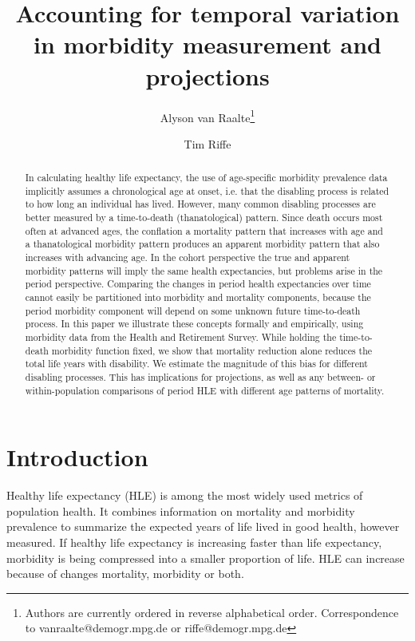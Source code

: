 \documentclass[11pt,oneside,a4paper]{article} %
\begin{document}
\title{Accounting for temporal variation in morbidity measurement
and projections}

\author[1]{Alyson van Raalte\thanks{Authors are currently ordered in reverse
alphabetical order. Correspondence to vanraalte@demogr.mpg.de or
riffe@demogr.mpg.de}}
\author[1]{Tim Riffe}


\maketitle

\begin{abstract}
In calculating healthy life expectancy, the use of age-specific morbidity
prevalence data implicitly assumes a chronological age at onset, i.e. that the
disabling process is related to how long an individual has lived. However, many
common disabling processes are better measured by a time-to-death
(thanatological) pattern.
Since death occurs most often at advanced ages, the conflation a mortality
pattern that increases with age and a thanatological morbidity pattern produces
an apparent morbidity pattern that also increases with advancing age. In the
cohort perspective the true and apparent morbidity patterns will imply the same
health expectancies, but problems arise in the period perspective. Comparing the
changes in period health expectancies over time cannot easily be partitioned
into morbidity and mortality components, because the period morbidity component
will depend on some unknown future time-to-death process. In this paper we
illustrate these concepts formally and empirically, using morbidity data from
the Health and Retirement Survey. While holding the time-to-death morbidity
function fixed, we show that mortality reduction alone reduces the total life
years with disability. We estimate the magnitude of this bias for different
disabling processes. This has implications for projections, as well as any
between- or within-population comparisons of period HLE with different age patterns of mortality.
\end{abstract}

\newpage
\section{Introduction}

Healthy life expectancy (HLE) is among the most widely used metrics of population health. It combines information on mortality and morbidity prevalence to summarize the expected years of life lived in good health, however measured. If healthy life expectancy is increasing faster than life expectancy, morbidity is being compressed into a smaller proportion of life. HLE can increase because of changes mortality, morbidity or both. 
\end{document}
